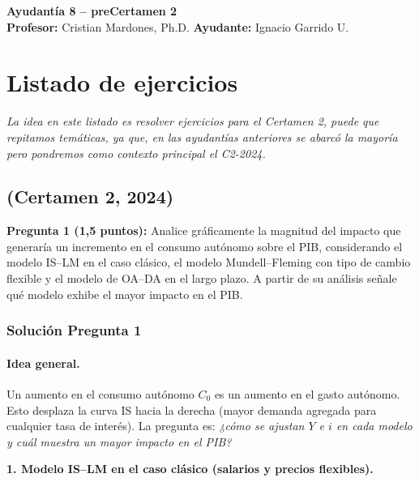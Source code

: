 \documentclass[11pt,addpoints]{article}
\begin{document}
\vspace*{0.01cm}

\begin{center}
{\Large \bfseries Ayudantía 8 -- preCertamen 2  \\[0.5cm]}
\textbf{Profesor:} Cristian Mardones, Ph.D. \quad \textbf{Ayudante:} Ignacio Garrido U.
\end{center}


\section*{Listado de ejercicios}
\textit{La idea en este listado es resolver ejercicios para el Certamen 2, puede que repitamos temáticas, ya que, en las ayudantías anteriores se abarcó la mayoría pero pondremos como contexto principal el C2-2024.}

\subsection*{(Certamen 2, 2024)}

\textbf{Pregunta 1 (1{,}5 puntos):}  
Analice gráficamente la magnitud del impacto que generaría un incremento en el consumo autónomo sobre el PIB, considerando el modelo IS--LM en el caso clásico, el modelo Mundell--Fleming con tipo de cambio flexible y el modelo de OA--DA en el largo plazo. A partir de su análisis señale qué modelo exhibe el mayor impacto en el PIB.

\subsubsection*{Solución Pregunta 1}

\paragraph{Idea general.}  
Un aumento en el consumo autónomo $C_0$ es un aumento en el gasto autónomo. Esto desplaza la curva IS hacia la derecha (mayor demanda agregada para cualquier tasa de interés). La pregunta es: \emph{¿cómo se ajustan $Y$ e $i$ en cada modelo y cuál muestra un mayor impacto en el PIB?}

\medskip

\textbf{1. Modelo IS--LM en el caso clásico (salarios y precios flexibles).}
\end{document}
